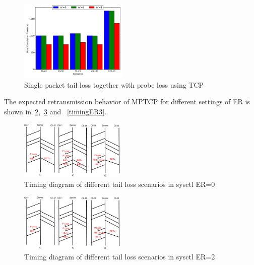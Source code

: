 \documentclass[10pt,draftcls,twocolumn]{IEEEconf}
\begin{document}
\begin{figure}[!ht]
\begin{center}
\includegraphics[angle=0, width=0.46\textwidth, natwidth=578.16,natheight=433.62]{plots/T1PP.pdf}
\caption{Single packet tail loss together with probe loss using TCP}\label{t1pp}
\end{center}
\end{figure}


The expected retransmission behavior of MPTCP for different settings of ER is shown 
in~\ref{timingER0},~\ref{timingER2} and ~\ref{timingER3}.

\begin{figure}[!ht]
\begin{center}
\includegraphics[angle=0, width=0.45\textwidth, natwidth=610, natheight=400]{images/timingER0.pdf}
\end{center}
\caption{Timing diagram of different tail loss scenarios in sysctl ER=0}\label{timingER0}
\end{figure}

\begin{figure}[!ht]
\begin{center}
\includegraphics[angle=0, width=0.45\textwidth, natwidth=610, natheight=400]{images/timingER2.pdf}
\end{center}
\caption{Timing diagram of different tail loss scenarios in sysctl ER=2}\label{timingER2}
\end{figure}
\end{document}
